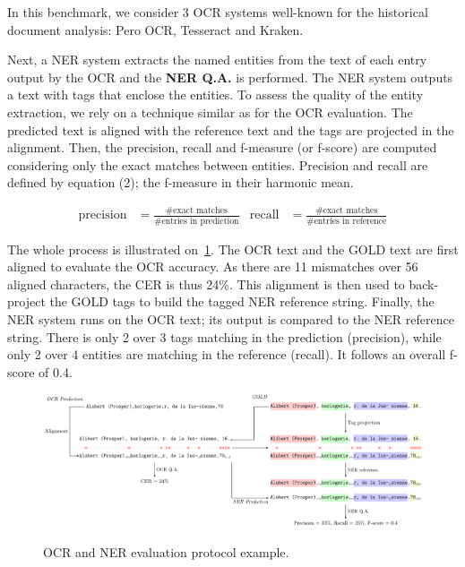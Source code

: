 In this benchmark, we consider 3 OCR systems well-known for the historical document analysis: Pero OCR, Tesseract and Kraken. 



Next, a NER system extracts the named entities from the text of each entry output by the OCR and the \textbf{NER Q.A.}
is performed. The NER system outputs a text with tags that enclose the entities. To assess the quality of the entity
extraction, we rely on a technique similar as for the OCR evaluation. The predicted text is aligned with the reference
text and the tags are projected in the alignment. Then, the precision, recall and f-measure (or f-score) are computed considering
only the exact matches between entities. Precision and recall are defined by equation (2); the f-measure in their harmonic mean.

\begin{align}
    \mathrm{precision} &= \frac{\text{\#exact matches}}{\text{\#entries in prediction}} & \mathrm{recall} &= \frac{\text{\#exact matches}}{\text{\#entries in reference}}
\end{align}


The whole process is illustrated on~\cref{fig.eval-ocr-ner}. The OCR text and the GOLD text are first aligned to
evaluate the OCR accuracy. As there are 11 mismatches over 56 aligned characters, the CER is thus 24\%. This alignment
is then used to back-project the GOLD tags to build the tagged NER reference string. Finally, the NER system runs on the
OCR text; its output is compared to the NER reference string. There is only 2 over 3 tags matching in the prediction (precision),
while only 2 over 4 entities are matching in the reference (recall). It follows an overall f-score of 0.4.


\begin{figure}[tb]
    \includegraphics[width=\linewidth]{figs/eval-ocr-ner.pdf}
    \label{fig.eval-ocr-ner}
    \caption{OCR and NER evaluation protocol example.}
\end{figure}






